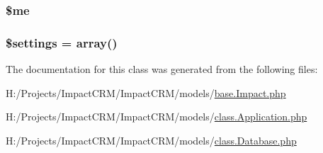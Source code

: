 \label{classImpact__Base_a6438a1b53245abfe71a285472f24934d}
\hypertarget{classImpact__Base_ad856a60cee1894f180e845f9b7b81458}{
\subsubsection[{\$me}]{\setlength{\rightskip}{0pt plus 5cm}\$me}}
\label{classImpact__Base_ad856a60cee1894f180e845f9b7b81458}
\hypertarget{classImpact__Base_ac7c3353107070daa85f641882931b358}{
\subsubsection[{\$settings}]{\setlength{\rightskip}{0pt plus 5cm}\$settings = array()}}
\label{classImpact__Base_ac7c3353107070daa85f641882931b358}


The documentation for this class was generated from the following files:\begin{DoxyCompactItemize}
\item 
H:/Projects/ImpactCRM/ImpactCRM/models/\hyperlink{base_8Impact_8php}{base.Impact.php}\item 
H:/Projects/ImpactCRM/ImpactCRM/models/\hyperlink{class_8Application_8php}{class.Application.php}\item 
H:/Projects/ImpactCRM/ImpactCRM/models/\hyperlink{class_8Database_8php}{class.Database.php}\end{DoxyCompactItemize}
